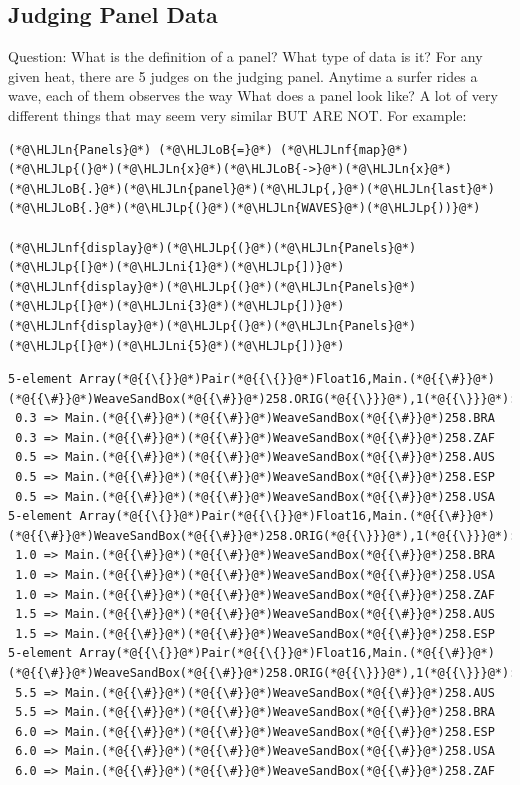 \documentclass[12pt,a4paper]{article}
\newcommand{\HLJLn}[1]{#1}
\newcommand{\HLJLnf}[1]{\textcolor[RGB]{66,102,213}{#1}}
\newcommand{\HLJLni}[1]{\textcolor[RGB]{59,151,46}{#1}}
\newcommand{\HLJLoB}[1]{\textcolor[RGB]{102,102,102}{\textbf{#1}}}
\newcommand{\HLJLp}[1]{#1}
\begin{document}
\subsection{Judging Panel Data}
Question: What is the definition of a panel? What type of data is it? For any given heat, there are 5 judges on the judging panel. Anytime a surfer rides a wave, each of them observes the way  What does a panel look like? A lot of very different things that may seem very similar BUT ARE NOT. For example:


\begin{lstlisting}
(*@\HLJLn{Panels}@*) (*@\HLJLoB{=}@*) (*@\HLJLnf{map}@*)(*@\HLJLp{(}@*)(*@\HLJLn{x}@*)(*@\HLJLoB{->}@*)(*@\HLJLn{x}@*)(*@\HLJLoB{.}@*)(*@\HLJLn{panel}@*)(*@\HLJLp{,}@*)(*@\HLJLn{last}@*)(*@\HLJLoB{.}@*)(*@\HLJLp{(}@*)(*@\HLJLn{WAVES}@*)(*@\HLJLp{))}@*)

(*@\HLJLnf{display}@*)(*@\HLJLp{(}@*)(*@\HLJLn{Panels}@*)(*@\HLJLp{[}@*)(*@\HLJLni{1}@*)(*@\HLJLp{])}@*)
(*@\HLJLnf{display}@*)(*@\HLJLp{(}@*)(*@\HLJLn{Panels}@*)(*@\HLJLp{[}@*)(*@\HLJLni{3}@*)(*@\HLJLp{])}@*)
(*@\HLJLnf{display}@*)(*@\HLJLp{(}@*)(*@\HLJLn{Panels}@*)(*@\HLJLp{[}@*)(*@\HLJLni{5}@*)(*@\HLJLp{])}@*)
\end{lstlisting}

\begin{lstlisting}
5-element Array(*@{{\{}}@*)Pair(*@{{\{}}@*)Float16,Main.(*@{{\#}}@*)(*@{{\#}}@*)WeaveSandBox(*@{{\#}}@*)258.ORIG(*@{{\}}}@*),1(*@{{\}}}@*):
 0.3 => Main.(*@{{\#}}@*)(*@{{\#}}@*)WeaveSandBox(*@{{\#}}@*)258.BRA
 0.3 => Main.(*@{{\#}}@*)(*@{{\#}}@*)WeaveSandBox(*@{{\#}}@*)258.ZAF
 0.5 => Main.(*@{{\#}}@*)(*@{{\#}}@*)WeaveSandBox(*@{{\#}}@*)258.AUS
 0.5 => Main.(*@{{\#}}@*)(*@{{\#}}@*)WeaveSandBox(*@{{\#}}@*)258.ESP
 0.5 => Main.(*@{{\#}}@*)(*@{{\#}}@*)WeaveSandBox(*@{{\#}}@*)258.USA
5-element Array(*@{{\{}}@*)Pair(*@{{\{}}@*)Float16,Main.(*@{{\#}}@*)(*@{{\#}}@*)WeaveSandBox(*@{{\#}}@*)258.ORIG(*@{{\}}}@*),1(*@{{\}}}@*):
 1.0 => Main.(*@{{\#}}@*)(*@{{\#}}@*)WeaveSandBox(*@{{\#}}@*)258.BRA
 1.0 => Main.(*@{{\#}}@*)(*@{{\#}}@*)WeaveSandBox(*@{{\#}}@*)258.USA
 1.0 => Main.(*@{{\#}}@*)(*@{{\#}}@*)WeaveSandBox(*@{{\#}}@*)258.ZAF
 1.5 => Main.(*@{{\#}}@*)(*@{{\#}}@*)WeaveSandBox(*@{{\#}}@*)258.AUS
 1.5 => Main.(*@{{\#}}@*)(*@{{\#}}@*)WeaveSandBox(*@{{\#}}@*)258.ESP
5-element Array(*@{{\{}}@*)Pair(*@{{\{}}@*)Float16,Main.(*@{{\#}}@*)(*@{{\#}}@*)WeaveSandBox(*@{{\#}}@*)258.ORIG(*@{{\}}}@*),1(*@{{\}}}@*):
 5.5 => Main.(*@{{\#}}@*)(*@{{\#}}@*)WeaveSandBox(*@{{\#}}@*)258.AUS
 5.5 => Main.(*@{{\#}}@*)(*@{{\#}}@*)WeaveSandBox(*@{{\#}}@*)258.BRA
 6.0 => Main.(*@{{\#}}@*)(*@{{\#}}@*)WeaveSandBox(*@{{\#}}@*)258.ESP
 6.0 => Main.(*@{{\#}}@*)(*@{{\#}}@*)WeaveSandBox(*@{{\#}}@*)258.USA
 6.0 => Main.(*@{{\#}}@*)(*@{{\#}}@*)WeaveSandBox(*@{{\#}}@*)258.ZAF
\end{lstlisting}
\end{document}
